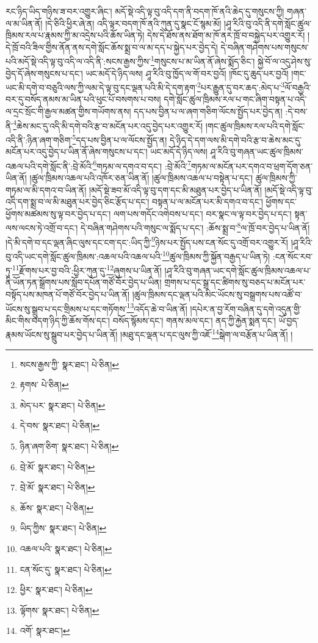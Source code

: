 རང་ཉིད་ཡིད་གཉིས་ཟ་བར་འགྱུར་ཞིང་། མདོ་སྡེ་འདི་ལྟ་བུ་འདི་དག་ནི་བདག་ཁོ་ནའི་ཆེད་དུ་གསུངས་ཀྱི། གཞན་ལ་མ་ཡིན་ནོ། །དེ་ཅིའི་ཕྱིར་ཞེ་ན། འདི་ལྟར་བདག་ཁོ་ནའི་ཀུན་དུ་སྣང་ངོ་སྙམ་མོ། །ཤཱ་རིའི་བུ་འདི་ནི་དགེ་སློང་ཚུལ་ཁྲིམས་རལ་པ་རྣམས་ཀྱི་མ་འདྲེས་པའི་ཆོས་ཡིན་ཏེ། དེས་དེ་ཐོས་ནས་ཐོག་མ་ཁོ་ནར་ཁྲོ་བ་བསྐྱེད་པར་འགྱུར་རོ། །དེ་ཁྲོ་བའི་ཟིལ་གྱིས་ནོན་ནས་དགེ་སློང་ཆོས་སྨྲ་བ་ལ་མ་དད་པ་སྐྱེད་པར་བྱེད་དེ། དེ་བཞིན་གཤེགས་པས་གསུངས་པའི་མདོ་སྡེ་འདི་ལྟ་བུ་འདི་ལ་འདི་ནི་:སངས་རྒྱས་ཀྱིས་\footnote{སངས་རྒྱས་ཀྱི་  སྣར་ཐང་།  པེ་ཅིན། }གསུངས་པ་མ་ཡིན་ནོ་ཞེས་སྨོད་ཅིང་། སྐྱེ་བོ་ལ་འདུ་ཤེས་སུ་བྱེད་དོ་ཞེས་གསུངས་པ་དང་། ཡང་མདོ་དེ་ཉིད་ལས། ཤཱ་རིའི་བུ་ཁྱོད་ལ་གོ་བར་བྱའོ། །ཁོང་དུ་ཆུད་པར་བྱའོ། །གང་ཡང་མི་དགེ་བ་བཅུའི་ལས་ཀྱི་ལམ་དེ་ལྟ་བུ་དང་ལྡན་པའི་མི་དེ་དག་རྟག་\footnote{རྟགས་  པེ་ཅིན། }པར་རྒྱུན་དུ་བར་ཆད་:མེད་པ་\footnote{མེད་པར་  སྣར་ཐང་།  པེ་ཅིན། }ལོ་བརྒྱའི་བར་དུ་བསོད་ནམས་མ་ཡིན་པའི་ཕུང་པོ་བསགས་པ་བས། དགེ་སློང་ཚུལ་ཁྲིམས་རལ་པ་གང་ཞིག་བསྟན་པ་འདི་ལ་དྲང་སྲོང་གི་རྒྱལ་མཚན་གྱིས་གཡོགས་ནས། དད་པས་བྱིན་པ་ལ་ཞག་གཅིག་ལོངས་སྤྱོད་པར་བྱེད་ན། :དེ་བས་ནི་\footnote{དེ་བས་  སྣར་ཐང་།  པེ་ཅིན། }ཆེས་མང་དུ་འདི་མི་དགེ་བའི་རྩ་བ་མངོན་པར་འདུ་བྱེད་པར་འགྱུར་རོ། །གང་ཚུལ་ཁྲིམས་རལ་པའི་དགེ་སློང་འདི་ནི་:ཉིན་ཞག་གཅིག་\footnote{ཉིན་ཞག་ཅིག་  སྣར་ཐང་།  པེ་ཅིན། }དད་པས་བྱིན་པ་ལ་ལོངས་སྤྱོད་ན། དེ་ཉིད་དེ་དག་ལས་མི་དགེ་བའི་རྩ་བ་ཆེས་མང་དུ་མངོན་པར་འདུ་བྱེད་པ་ཡིན་ནོ་ཞེས་གསུངས་པ་དང་། ཡང་མདོ་དེ་ཉིད་ལས། ཤཱ་རིའི་བུ་གཞན་ཡང་ཚུལ་ཁྲིམས་འཆལ་པའི་དགེ་སློང་ནི་:བྲེ་མོའི་\footnote{བྲེ་མོ་  སྣར་ཐང་།  པེ་ཅིན། }གཏམ་ལ་དགའ་བ་དང་། :བྲེ་མོའི་\footnote{བྲེ་མོ་  སྣར་ཐང་།  པེ་ཅིན། }གཏམ་ལ་མངོན་པར་དགའ་བ་ཕྲག་དོག་ཅན་ཡིན་ནོ། །ཚུལ་ཁྲིམས་འཆལ་པའི་འཁོར་ཅན་ཡིན་ནོ། །ཚུལ་ཁྲིམས་འཆལ་པ་བསྟེན་པ་དང་། ཚུལ་ཁྲིམས་ཀྱི་གཏམ་ལ་མི་དགའ་བ་ཡིན་ནོ། །མདོ་སྡེ་ཟབ་མོ་འདི་ལྟ་བུ་དག་དང་མི་མཐུན་པར་བྱེད་པ་ཡིན་ནོ། །མདོ་སྡེ་འདི་ལྟ་བུ་འདི་དག་སྨྲ་བ་ལ་མི་མཐུན་པར་བྱེད་ཅིང་རྩོད་པ་དང་། བསྟན་པ་ལ་མངོན་པར་མི་དགའ་བ་དང་། ཕྱོགས་དང་ཕྱོགས་མཚམས་སུ་ལྟ་བར་བྱེད་པ་དང་། ལག་པས་གདོང་འགེབས་པ་དང་། བར་སྣང་ལ་ལྟ་བར་བྱེད་པ་དང་། སྟན་ལས་ལངས་ཏེ་འགྲོ་བ་དང་། དེ་བཞིན་གཤེགས་པའི་གསུང་ལ་སྨོད་པ་དང་། :ཆོས་སྨྲ་བ་\footnote{ཆོས་  སྣར་ཐང་།  པེ་ཅིན། }ལ་ཁྲོ་བར་བྱེད་པ་ཡིན་ནོ། །དེ་མི་དགེ་བ་དང་ལྡན་ཞིང་ལུས་དང་ངག་དང་:ཡིད་ཀྱི་\footnote{ཡིད་ཀྱིས་  སྣར་ཐང་།  པེ་ཅིན། }ཉེས་པར་སྤྱོད་པས་ངན་སོང་དུ་འགྲོ་བར་འགྱུར་རོ། །ཤཱ་རིའི་བུ་འདི་ཡང་དགེ་སློང་ཚུལ་ཁྲིམས་:འཆལ་པའི་འཆལ་པའི་\footnote{འཆལ་པའི་  སྣར་ཐང་།  པེ་ཅིན། }ཚུལ་ཁྲིམས་ཀྱི་སྐྱོན་བརྒྱད་པ་ཡིན་ཏེ། :ངན་སོང་རབ་ཏུ་\footnote{ངན་སོང་དུ་  སྣར་ཐང་།  པེ་ཅིན། }རྫོགས་པར་བྱ་བའི་:ཕྱིར་ཀུན་དུ་\footnote{ཕྱིར་  སྣར་ཐང་།  པེ་ཅིན། }ཞུགས་པ་ཡིན་ནོ། །ཤཱ་རིའི་བུ་གཞན་ཡང་དགེ་སློང་ཚུལ་ཁྲིམས་འཆལ་པ་ནི་ཡོན་ཏན་སྒྲོགས་པས་སློབ་དཔོན་གཙོ་བོར་བྱེད་པ་ཡིན། གྲགས་པ་དང་སྒྲ་དང་ཚིགས་སུ་བཅད་པ་མངོན་པར་བསྟོད་པས་མཁན་པོ་གཙོ་བོར་བྱེད་པ་ཡིན་ནོ། །ཚུལ་ཁྲིམས་དང་ལྡན་པའི་མིང་ཡོངས་སུ་བསྒྲགས་པས་འཚོ་བ་ཡོངས་སུ་སྒྲུབ་པ་དང་གྲིམས་པ་དང་གཏོགས་\footnote{ལྟོགས་  སྣར་ཐང་།  པེ་ཅིན། }འདོད་ཆེ་བ་ཡིན་ནོ། །དཔེར་ན་བྱ་རོག་བཞིན་དུ་དགེ་འདུན་གྱི་མིང་གིས་བདག་ཉིད་ཀྱི་ཆོས་གོས་དང་། བསོད་སྙོམས་དང་། གནས་མལ་དང་། ནད་ཀྱི་རྐྱེན་སྨན་དང་། ཡོ་བྱད་རྣམས་ཡོངས་སུ་སྒྲུབ་པར་བྱེད་པ་ཡིན་ནོ། །མཐུ་དང་ལྡན་པ་དང་ལུས་ཀྱི་འཇོ་\footnote{འགོ་  སྣར་ཐང་། }སྒེག་ལ་བརྩོན་པ་ཡིན་ནོ། །
